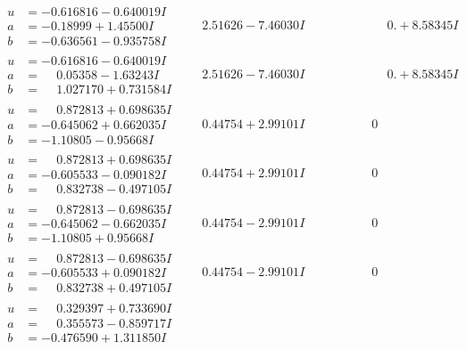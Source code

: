 \documentclass[1p]{elsarticle_modified}
\theoremstyle{definition}
\begin{document}
$$\begin{array}{c|c|c}
\begin{aligned}
u &= -0.616816 - 0.640019 I \\
a &= -0.18999 + 1.45500 I \\
b &= -0.636561 - 0.935758 I\end{aligned}
 & \phantom{-}2.51626 - 7.46030 I & \phantom{-0.000000 -}0. + 8.58345 I \\ \hline\begin{aligned}
u &= -0.616816 - 0.640019 I \\
a &= \phantom{-}0.05358 - 1.63243 I \\
b &= \phantom{-}1.027170 + 0.731584 I\end{aligned}
 & \phantom{-}2.51626 - 7.46030 I & \phantom{-0.000000 -}0. + 8.58345 I \\ \hline\begin{aligned}
u &= \phantom{-}0.872813 + 0.698635 I \\
a &= -0.645062 + 0.662035 I \\
b &= -1.10805 - 0.95668 I\end{aligned}
 & \phantom{-}0.44754 + 2.99101 I & \phantom{-0.000000 } 0 \\ \hline\begin{aligned}
u &= \phantom{-}0.872813 + 0.698635 I \\
a &= -0.605533 - 0.090182 I \\
b &= \phantom{-}0.832738 - 0.497105 I\end{aligned}
 & \phantom{-}0.44754 + 2.99101 I & \phantom{-0.000000 } 0 \\ \hline\begin{aligned}
u &= \phantom{-}0.872813 - 0.698635 I \\
a &= -0.645062 - 0.662035 I \\
b &= -1.10805 + 0.95668 I\end{aligned}
 & \phantom{-}0.44754 - 2.99101 I & \phantom{-0.000000 } 0 \\ \hline\begin{aligned}
u &= \phantom{-}0.872813 - 0.698635 I \\
a &= -0.605533 + 0.090182 I \\
b &= \phantom{-}0.832738 + 0.497105 I\end{aligned}
 & \phantom{-}0.44754 - 2.99101 I & \phantom{-0.000000 } 0 \\ \hline\begin{aligned}
u &= \phantom{-}0.329397 + 0.733690 I \\
a &= \phantom{-}0.355573 - 0.859717 I \\
b &= -0.476590 + 1.311850 I\end{aligned}

\end{array}$$
\end{document}
